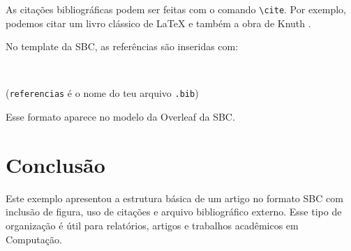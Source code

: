 \documentclass[12pt]{article}
\begin{document}
As citações bibliográficas podem ser feitas com o comando \verb|\cite|. Por exemplo, podemos citar um livro clássico de \LaTeX{} \cite{lamport:94} e também a obra de Knuth \cite{knuth:84}.

No template da SBC, as referências são inseridas com:

\begin{verbatim}


\end{verbatim}

\noindent (\texttt{referencias} é o nome do teu arquivo \texttt{.bib})

Esse formato aparece no modelo da Overleaf da SBC.

\section{Conclusão}

Este exemplo apresentou a estrutura básica de um artigo no formato SBC com inclusão de figura, uso de citações e arquivo bibliográfico externo. Esse tipo de organização é útil para relatórios, artigos e trabalhos acadêmicos em Computação.



\end{document}
